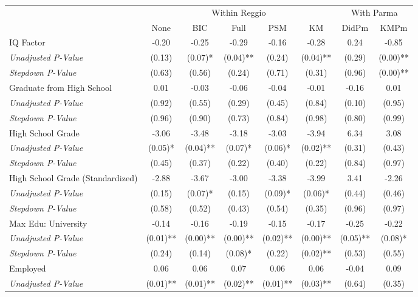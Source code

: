 \begin{tabular}{l c c c c c c c}
\toprule
& \multicolumn{5}{c}{Within Reggio} & \multicolumn{2}{c}{With Parma}  \\\cmidrule(lr){2-6} \cmidrule(lr){7-8}
 & None & BIC & Full & PSM & KM & DidPm & KMPm \\
\midrule
IQ Factor & -0.20 & -0.25 & -0.29 & -0.16 & -0.28 & 0.24 & -0.85 \\
\quad \textit{Unadjusted P-Value} & (0.13) & (0.07)* & (0.04)** & (0.24) & (0.04)** & (0.29) & (0.00)** \\
\quad \textit{Stepdown P-Value} & (0.63) & (0.56) & (0.24) & (0.71) & (0.31) & (0.96) & (0.00)** \\
Graduate from High School & 0.01 & -0.03 & -0.06 & -0.04 & -0.01 & -0.16 & 0.01 \\
\quad \textit{Unadjusted P-Value} & (0.92) & (0.55) & (0.29) & (0.45) & (0.84) & (0.10) & (0.95) \\
\quad \textit{Stepdown P-Value} & (0.96) & (0.90) & (0.73) & (0.84) & (0.98) & (0.80) & (0.99) \\
High School Grade & -3.06 & -3.48 & -3.18 & -3.03 & -3.94 & 6.34 & 3.08 \\
\quad \textit{Unadjusted P-Value} & (0.05)* & (0.04)** & (0.07)* & (0.06)* & (0.02)** & (0.31) & (0.43) \\
\quad \textit{Stepdown P-Value} & (0.45) & (0.37) & (0.22) & (0.40) & (0.22) & (0.84) & (0.97) \\
High School Grade (Standardized) & -2.88 & -3.67 & -3.00 & -3.38 & -3.99 & 3.41 & -2.26 \\
\quad \textit{Unadjusted P-Value} & (0.15) & (0.07)* & (0.15) & (0.09)* & (0.06)* & (0.44) & (0.46) \\
\quad \textit{Stepdown P-Value} & (0.58) & (0.52) & (0.43) & (0.54) & (0.35) & (0.96) & (0.97) \\
Max Edu: University & -0.14 & -0.16 & -0.19 & -0.15 & -0.17 & -0.25 & -0.22 \\
\quad \textit{Unadjusted P-Value} & (0.01)** & (0.00)** & (0.00)** & (0.02)** & (0.00)** & (0.05)** & (0.08)* \\
\quad \textit{Stepdown P-Value} & (0.24) & (0.14) & (0.08)* & (0.22) & (0.02)** & (0.53) & (0.55) \\
Employed & 0.06 & 0.06 & 0.07 & 0.06 & 0.06 & -0.04 & 0.09 \\
\quad \textit{Unadjusted P-Value} & (0.01)** & (0.01)** & (0.02)** & (0.01)** & (0.03)** & (0.64) & (0.35) \\

\end{tabular}
